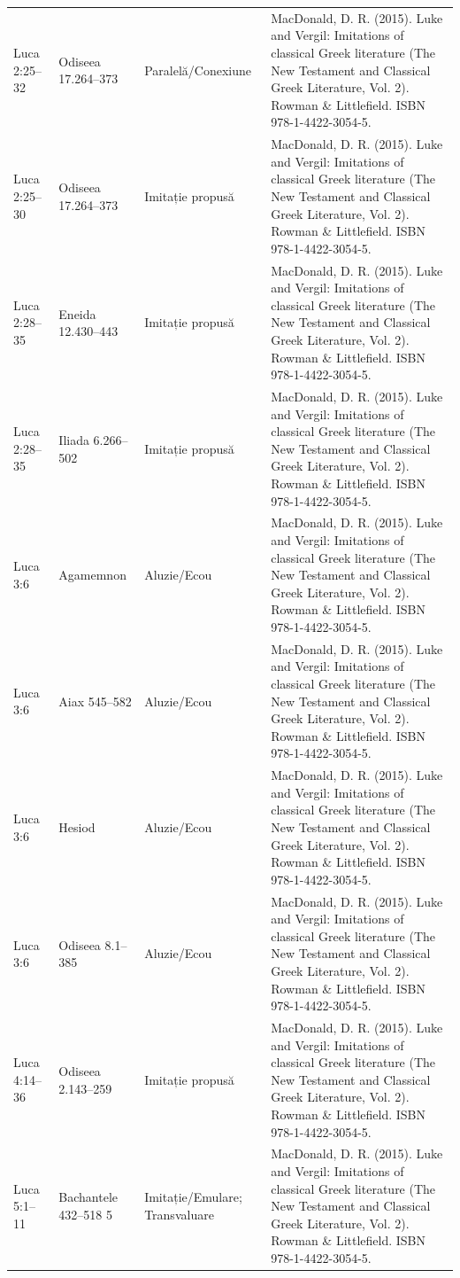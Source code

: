 \documentclass[12pt,a4paper,twoside,openany]{book}
\begin{document}
\begin{longtable}{L{1.4cm}L{1.7cm}L{3.1cm}L{8.4cm}}
Luca 2:25–32 & Odiseea 17.264–373 & Paralelă/Conexiune & MacDonald, D. R. (2015). Luke and Vergil: Imitations of classical Greek literature (The New Testament and Classical Greek Literature, Vol. 2). Rowman \& Littlefield. ISBN 978-1-4422-3054-5. \\
Luca 2:25–30 & Odiseea 17.264–373 & Imitație propusă & MacDonald, D. R. (2015). Luke and Vergil: Imitations of classical Greek literature (The New Testament and Classical Greek Literature, Vol. 2). Rowman \& Littlefield. ISBN 978-1-4422-3054-5. \\
Luca 2:28–35 & Eneida 12.430–443 & Imitație propusă & MacDonald, D. R. (2015). Luke and Vergil: Imitations of classical Greek literature (The New Testament and Classical Greek Literature, Vol. 2). Rowman \& Littlefield. ISBN 978-1-4422-3054-5. \\
Luca 2:28–35 & Iliada 6.266–502 & Imitație propusă & MacDonald, D. R. (2015). Luke and Vergil: Imitations of classical Greek literature (The New Testament and Classical Greek Literature, Vol. 2). Rowman \& Littlefield. ISBN 978-1-4422-3054-5. \\
Luca 3:6 & Agamemnon & Aluzie/Ecou & MacDonald, D. R. (2015). Luke and Vergil: Imitations of classical Greek literature (The New Testament and Classical Greek Literature, Vol. 2). Rowman \& Littlefield. ISBN 978-1-4422-3054-5. \\
Luca 3:6 & Aiax 545–582 & Aluzie/Ecou & MacDonald, D. R. (2015). Luke and Vergil: Imitations of classical Greek literature (The New Testament and Classical Greek Literature, Vol. 2). Rowman \& Littlefield. ISBN 978-1-4422-3054-5. \\
Luca 3:6 & Hesiod & Aluzie/Ecou & MacDonald, D. R. (2015). Luke and Vergil: Imitations of classical Greek literature (The New Testament and Classical Greek Literature, Vol. 2). Rowman \& Littlefield. ISBN 978-1-4422-3054-5. \\
Luca 3:6 & Odiseea 8.1–385 & Aluzie/Ecou & MacDonald, D. R. (2015). Luke and Vergil: Imitations of classical Greek literature (The New Testament and Classical Greek Literature, Vol. 2). Rowman \& Littlefield. ISBN 978-1-4422-3054-5. \\
Luca 4:14–36 & Odiseea 2.143–259 & Imitație propusă & MacDonald, D. R. (2015). Luke and Vergil: Imitations of classical Greek literature (The New Testament and Classical Greek Literature, Vol. 2). Rowman \& Littlefield. ISBN 978-1-4422-3054-5. \\
Luca 5:1–11 & Bachantele 432–518 5 & Imitație/Emulare; Transvaluare & MacDonald, D. R. (2015). Luke and Vergil: Imitations of classical Greek literature (The New Testament and Classical Greek Literature, Vol. 2). Rowman \& Littlefield. ISBN 978-1-4422-3054-5. \\

\end{longtable}
\end{document}
